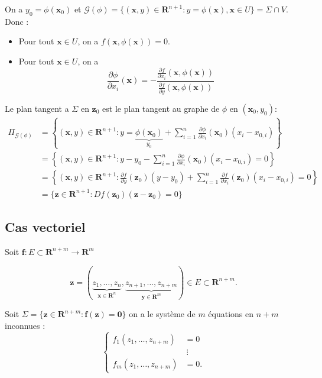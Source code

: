 \begin{remark}
On a $y_{0}=\phi(\boldsymbol{x}_{0})$ et $\mathcal{G}(\phi)=\{ (\boldsymbol{x},y)\in \mathbf{R}^{n+1}:y=\phi(\boldsymbol{x}),\boldsymbol{x}\in U \}=\Sigma \cap V$. Donc :
\begin{itemize}
\item Pour tout $\boldsymbol{x}\in U$, on a $f(\boldsymbol{x},\phi(\boldsymbol{x}))=0$.
\item Pour tout $\boldsymbol{x}\in U$, on a $$\frac{ \partial \phi }{ \partial x_{i} }(\boldsymbol{x})=-\frac{\frac{ \partial f }{ \partial x_{i} }(\boldsymbol{x},\phi(\boldsymbol{x}))}{\frac{ \partial f }{ \partial y }(\boldsymbol{x},\phi(\boldsymbol{x}))}$$
\end{itemize}
Le plan tangent a $\Sigma$ en $\boldsymbol{z}_{0}$ est le plan tangent au graphe de $\phi$ en $(\boldsymbol{x}_{0},y_{0})$:
\begin{align*}
\Pi_{\mathcal{G}(\phi)} & =\left\{ (\boldsymbol{x},y)\in \mathbf{R}^{n+1} : y=\underbrace{ \phi(\boldsymbol{x}_{0}) }_{ y_{0} }+\sum _{i=1}^{n}\frac{ \partial \phi }{ \partial x_{i} } (\boldsymbol{x}_{0})(x_{i}-x_{0,i} )     \right\} \\
 & =\left\{  (\boldsymbol{x},y)\in \mathbf{R}^{n+1} : y-y_{0}-\sum_{i=1}^{n} \frac{ \partial \phi }{ \partial x_{i} } (\boldsymbol{x}_{0})(x_{i}-x_{0,i}) =0 \right\} \\
 & = \left\{  (\boldsymbol{x},y)\in \mathbf{R}^{n+1}:\frac{ \partial f }{ \partial y } (\boldsymbol{z}_{0})(y-y_{0}) +\sum_{i=1}^{n} \frac{ \partial f }{ \partial x_{i}  }(\boldsymbol{z}_{0})(x_{i}-x_{0,i})=0 \right\} \\
 & =\{ \boldsymbol{z}\in \mathbf{R}^{n+1}:Df(\boldsymbol{z}_{0})(\boldsymbol{z}-\boldsymbol{z}_{0}) =0 \}
\end{align*}
\end{remark}
\subsection{Cas vectoriel}
Soit $\boldsymbol{f}:E\subset \mathbf{R}^{n+m}\to \mathbf{R}^{m}$
\begin{notation}
$$
\boldsymbol{z}=(\underbrace{ z_{1},\dots,z_{n} }_{ \boldsymbol{x}\in \mathbf{R}^{n} },\underbrace{ z_{n+1},\dots,z_{n+m} }_{ \boldsymbol{y}\in \mathbf{R}^{m} })\in E\subset \mathbf{R}^{n+m}.
$$
\end{notation}

Soit $\Sigma=\{ \boldsymbol{z}\in \mathbf{R}^{n+m}:\boldsymbol{f}(\boldsymbol{z}) =\boldsymbol{0}\}$ on a le système de $m$ équations en $n+m$ inconnues :
$$
\begin{cases}
f_{1}(z_{1},\dots,z_{n+m}) & =0 \\
 &~ \vdots \\
f_{m}(z_{1},\dots,z_{n+m}) & =0.
\end{cases}
$$

